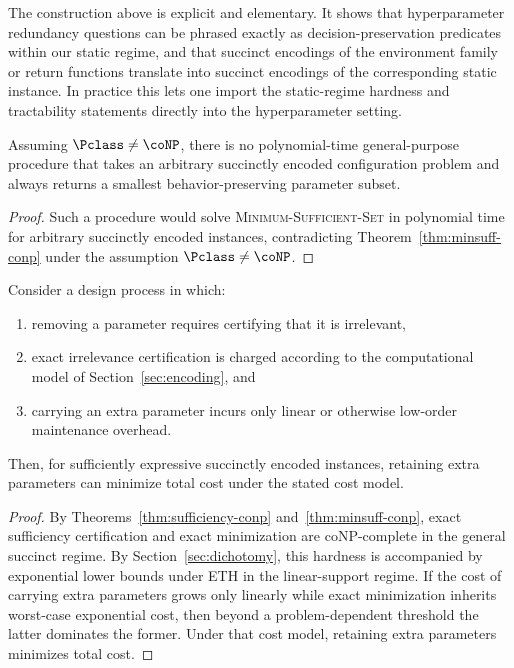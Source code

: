 The construction above is explicit and elementary. It shows that hyperparameter redundancy questions can be phrased exactly as decision-preservation predicates within our static regime, and that succinct encodings of the environment family or return functions translate into succinct encodings of the corresponding static instance. In practice this lets one import the static-regime hardness and tractability statements directly into the hyperparameter setting.


\begin{corollary}
\label{cor:no-general-minimizer}
Assuming $\Pclass \neq \coNP$, there is no polynomial-time general-purpose procedure that takes an arbitrary succinctly encoded configuration problem and always returns a smallest behavior-preserving parameter subset.
\end{corollary}


\begin{proof}
Such a procedure would solve \textsc{Minimum-Sufficient-Set} in polynomial time for arbitrary succinctly encoded instances, contradicting Theorem~\ref{thm:minsuff-conp} under the assumption $\Pclass \neq \coNP$.
\end{proof}

\begin{proposition}
\label{prop:rational-overspecification}
Consider a design process in which:
\begin{enumerate}
\item removing a parameter requires certifying that it is irrelevant,
\item exact irrelevance certification is charged according to the computational model of Section~\ref{sec:encoding}, and
\item carrying an extra parameter incurs only linear or otherwise low-order maintenance overhead.
\end{enumerate}
Then, for sufficiently expressive succinctly encoded instances, retaining extra parameters can minimize total cost under the stated cost model.
\end{proposition}


\begin{proof}
By Theorems~\ref{thm:sufficiency-conp} and~\ref{thm:minsuff-conp}, exact sufficiency certification and exact minimization are coNP-complete in the general succinct regime. By Section~\ref{sec:dichotomy}, this hardness is accompanied by exponential lower bounds under ETH in the linear-support regime. If the cost of carrying extra parameters grows only linearly while exact minimization inherits worst-case exponential cost, then beyond a problem-dependent threshold the latter dominates the former. Under that cost model, retaining extra parameters minimizes total cost.
\end{proof}

